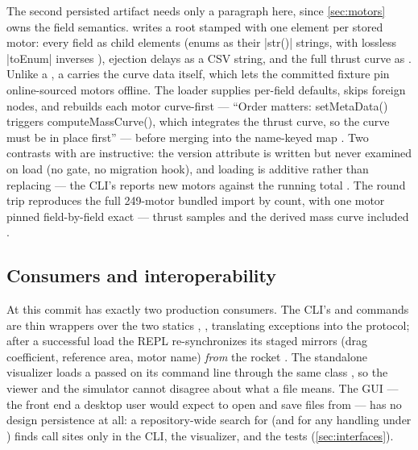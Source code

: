 The second persisted artifact needs only a paragraph here, since \cref{sec:motors} owns
the field semantics.  writes a  root
stamped   with one
 element per stored motor: every  field as child elements
(enums as their \cppinline|str()| strings, with lossless \cppinline|toEnum| inverses
), ejection delays as a CSV string, and the full
thrust curve as 
. Unlike a , a  carries the
curve data itself, which lets the committed 
fixture pin online-sourced motors offline. The loader supplies per-field defaults, skips
foreign nodes, and rebuilds each motor curve-first --- ``Order matters: setMetaData()
triggers computeMassCurve(), which integrates the thrust curve, so the curve must be in
place first''  --- before merging into the
name-keyed map . Two contrasts with 
are instructive: the  version attribute is written but never examined on load
 (no gate, no migration hook), and loading is
additive rather than replacing --- the CLI's  reports new motors against the
running total . The round trip reproduces the full 249-motor
bundled import by count, with one motor pinned field-by-field exact --- thrust samples
and the derived mass curve included .

\subsection{Consumers and interoperability}\label{sec:persistence-consumers}

At this commit  has exactly two production consumers. The CLI's
 and  commands are thin wrappers over the two statics
, , translating exceptions into the
 protocol; after a successful load the REPL re-synchronizes its staged mirrors
(drag coefficient, reference area, motor name) \emph{from} the rocket
. The standalone visualizer loads a  passed on its
command line through the same class , so the
viewer and the simulator cannot disagree about what a file means. The GUI --- the front
end a desktop user would expect to open and save files from --- has no design persistence
at all: a repository-wide search for  (and for any 
handling under ) finds call sites only in the CLI, the visualizer, and the
tests (\cref{sec:interfaces}).

